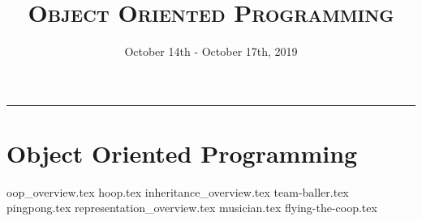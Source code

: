 \documentclass{exam}
\title{\textsc{Object Oriented Programming}}
\date{October 14th - October 17th, 2019}
\begin{document}
\maketitle
\rule{\textwidth}{0.15em}
\fontsize{12}{15}\selectfont

\section{Object Oriented Programming}
\begin{questions}
{oop_overview.tex}
{hoop.tex}
{inheritance_overview.tex}
{team-baller.tex}
{pingpong.tex}
\newpage
{representation_overview.tex}
{musician.tex}
{flying-the-coop.tex}
\end{questions}
\end{document}
